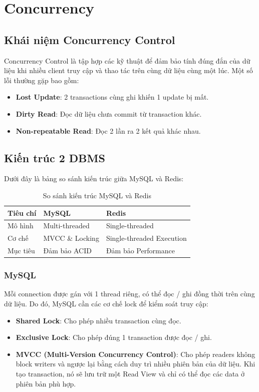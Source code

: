 \section{Concurrency}
\subsection{Khái niệm Concurrency Control}
Concurrency Control là tập hợp các kỹ thuật để đảm bảo tính đúng đắn của dữ liệu khi nhiều client truy cập và thao tác trên cùng dữ liệu cùng một lúc. Một số lỗi thường gặp bao gồm:
\begin{itemize}
    \item \textbf{Lost Update}: 2 transactions cùng ghi khiến 1 update bị mất.
    \item \textbf{Dirty Read}: Đọc dữ liệu chưa commit từ transaction khác.
    \item \textbf{Non-repeatable Read}: Đọc 2 lần ra 2 kết quả khác nhau.
\end{itemize}

\subsection{Kiến trúc 2 DBMS}
Dưới đây là bảng so sánh kiến trúc giữa MySQL và Redis:

\begin{table}[H]
\centering
\caption{So sánh kiến trúc MySQL và Redis}
\label{tab:arch-compare}
\begin{tabular}{|l|l|l|}
\hline
\textbf{Tiêu chí} & \textbf{MySQL} & \textbf{Redis} \\ \hline
Mô hình & Multi-threaded & Single-threaded \\ \hline
Cơ chế & MVCC \& Locking & Single-threaded Execution \\ \hline
Mục tiêu & Đảm bảo ACID & Đảm bảo Performance \\ \hline
\end{tabular}
\end{table}

\subsubsection{MySQL}

Mỗi connection được gán với 1 thread riêng, có thể đọc / ghi đồng thời trên cùng dữ liệu. Do đó, MySQL cần các cơ chế lock để kiểm soát truy cập:
\begin{itemize}
    \item \textbf{Shared Lock}: Cho phép nhiều transaction cùng đọc.
    \item \textbf{Exclusive Lock}: Cho phép đúng 1 transaction được đọc / ghi.
    \item \textbf{MVCC (Multi-Version Concurrency Control)}: Cho phép readers không block writers và ngược lại bằng cách duy trì nhiều phiên bản của dữ liệu. Khi tạo transaction, nó sẽ lưu trữ một Read View và chỉ có thể đọc các data ở phiên bản phù hợp.
\end{itemize}

